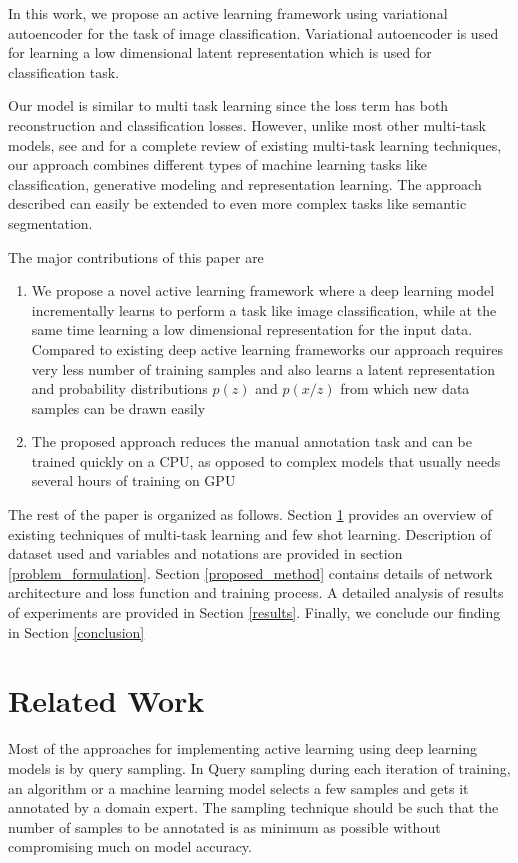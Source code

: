 \documentclass{uai2021} %
\begin{document}
In this work, we propose an active learning framework using variational autoencoder for the task of  image classification.
Variational autoencoder is used for learning a low dimensional latent representation which is used for classification task.


Our model is similar to multi task learning since the loss term has both reconstruction and classification losses.
However, unlike most other multi-task models, see \cite{ruder2017overview} and \cite{crawshaw2020multi} for a complete review of existing multi-task learning techniques, our approach combines  different types of machine learning tasks like classification, generative modeling and representation learning.
The approach described can easily be extended to even more complex tasks like semantic segmentation.

The major contributions of this paper are
\begin{enumerate}
    \item We propose a novel active learning framework where a  deep learning model incrementally learns to perform a task like image classification, while at the same time learning a low dimensional representation for the input data.
          Compared to existing deep active learning frameworks our approach requires very less number of training samples and also learns a latent representation and  probability distributions $p(z)$ and $p(x/z)$ from which new data samples can be drawn easily
    \item The proposed approach reduces the manual annotation task and can be trained quickly on a CPU, as opposed to complex models that usually needs several hours of training on GPU
\end{enumerate}

The rest of the paper is organized as follows.
Section \ref{related_works} provides an overview of existing techniques of multi-task learning and few shot learning.
Description of dataset used and variables and notations are provided in section \ref{problem_formulation}.
Section \ref{proposed_method} contains details of network architecture and loss function and training process.
A detailed analysis of results of experiments are provided in Section \ref{results}.
Finally, we conclude our finding in Section \ref{conclusion}

\section{Related Work} \label{related_works}
Most of the approaches for implementing active learning using deep learning models is by query sampling.
In Query sampling during each iteration of training, an algorithm or a machine learning model selects a few samples and gets it annotated by a domain expert\cite{sinha2019variational}\cite{sener2017active}.
The sampling technique should be such that the number of samples to be annotated is as minimum as possible without compromising much on model accuracy.
\end{document}
